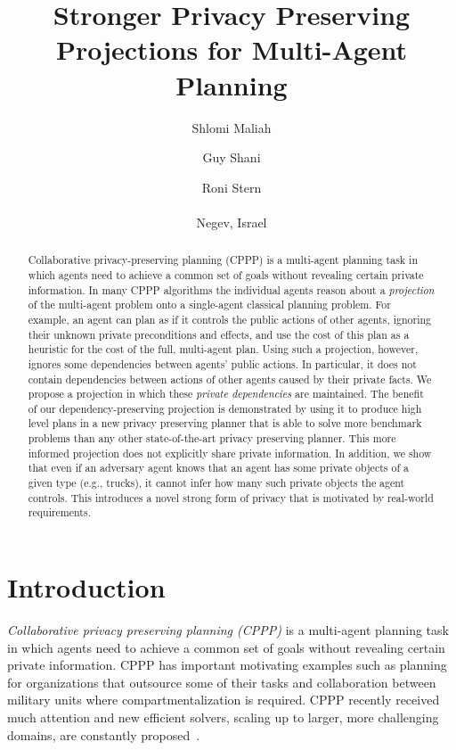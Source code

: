 \documentclass[letterpaper]{article}
\theoremstyle{definition}
\begin{document}
\title{Stronger Privacy Preserving Projections for Multi-Agent Planning}
\author{Shlomi Maliah \and Guy Shani \and Roni Stern\\\\
Negev, Israel\\
}
\maketitle
\begin{abstract}
Collaborative privacy-preserving planning (CPPP) is a multi-agent planning task in which agents need to achieve a common set of goals without revealing certain private information. In many CPPP algorithms the individual agents reason about a {\em projection} of the multi-agent problem onto a single-agent classical planning problem.
For example, an agent can plan as if it controls the public actions of other agents, ignoring their unknown private preconditions and effects, and use the cost of this plan as a heuristic for the cost of the full, multi-agent plan. Using such a projection, however, ignores some dependencies between agents' public actions. In particular, it does not contain dependencies between actions  of other agents caused by their private facts. We propose a projection in which these {\em private dependencies} are maintained.
The benefit of our dependency-preserving projection is demonstrated by using it to produce high level plans in a new privacy preserving planner that is able to solve more benchmark problems than any other state-of-the-art privacy preserving planner.
This more informed projection does not explicitly share private information. In addition, we show that even if an adversary agent knows that an agent has some private objects of a given type (e.g., trucks), it cannot infer how many such private objects the agent controls. This introduces a novel strong form of privacy that is motivated by real-world requirements.
\end{abstract}
\section{Introduction}



{\em Collaborative privacy preserving planning (CPPP)} is a multi-agent planning task in which agents need to achieve a common set of goals without revealing certain private information. CPPP has important motivating examples such as planning for organizations that outsource some of their tasks and collaboration between military units where compartmentalization is required. CPPP recently received much attention
and new efficient solvers, scaling up to larger, more challenging domains, are constantly proposed~\cite[inter alia]{maliah2015privacy,nissim2014distributed,luis2014planMerging,tovzivcka2014generating,jakubuv2015multiagent}.
\end{document}
